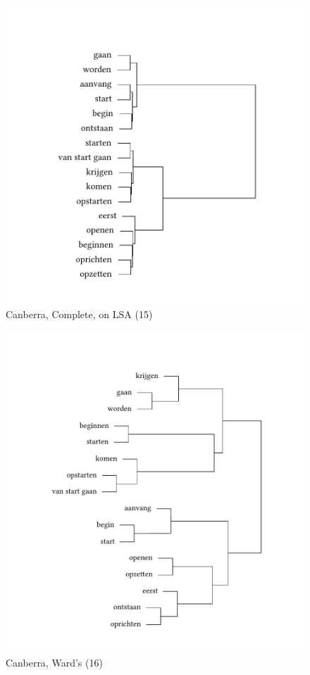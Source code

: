 \begin{figure}
\includegraphics[height=.4\textheight]{figures/tree44.pdf}
\caption{\label{fig:3:44}  Canberra, Complete, on LSA (15)}
\end{figure}

\begin{figure}
\includegraphics[height=.4\textheight]{figures/tree45.pdf}
\caption{\label{fig:3:45}  Canberra, Ward’s (16)}
\end{figure}

